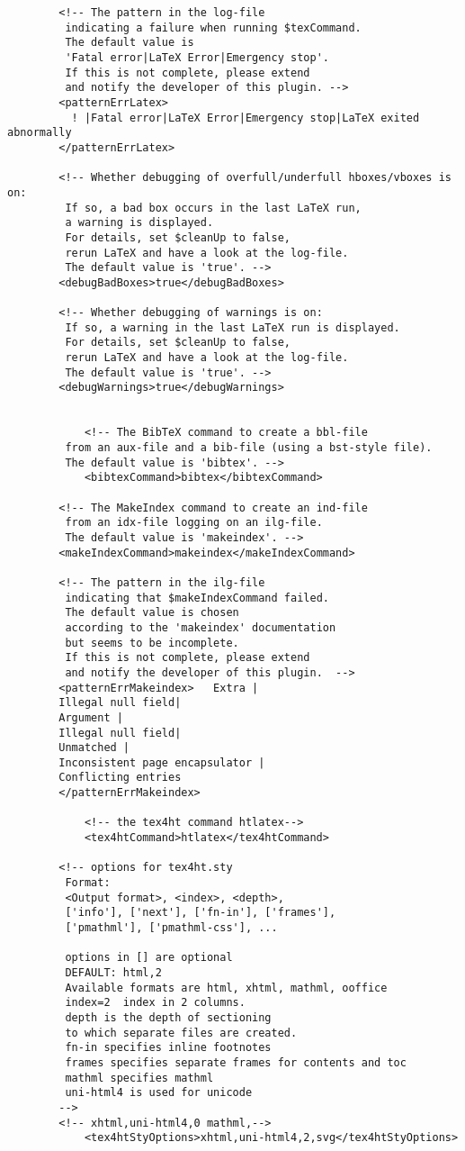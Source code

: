 \documentclass[12pt]{article}
\begin{document}
\begin{lstlisting}
	    <!-- The pattern in the log-file 
		 indicating a failure when running $texCommand. 
		 The default value is 
		 'Fatal error|LaTeX Error|Emergency stop'. 
		 If this is not complete, please extend 
		 and notify the developer of this plugin. -->
	    <patternErrLatex>
	      ! |Fatal error|LaTeX Error|Emergency stop|LaTeX exited abnormally
	    </patternErrLatex>

	    <!-- Whether debugging of overfull/underfull hboxes/vboxes is on: 
		 If so, a bad box occurs in the last LaTeX run, 
		 a warning is displayed. 
		 For details, set $cleanUp to false, 
		 rerun LaTeX and have a look at the log-file.
		 The default value is 'true'. -->
	    <debugBadBoxes>true</debugBadBoxes>

	    <!-- Whether debugging of warnings is on: 
		 If so, a warning in the last LaTeX run is displayed. 
		 For details, set $cleanUp to false, 
		 rerun LaTeX and have a look at the log-file. 
		 The default value is 'true'. -->
	    <debugWarnings>true</debugWarnings>


            <!-- The BibTeX command to create a bbl-file 
		 from an aux-file and a bib-file (using a bst-style file). 
		 The default value is 'bibtex'. -->
            <bibtexCommand>bibtex</bibtexCommand>

	    <!-- The MakeIndex command to create an ind-file 
		 from an idx-file logging on an ilg-file. 
		 The default value is 'makeindex'. -->
	    <makeIndexCommand>makeindex</makeIndexCommand>

	    <!-- The pattern in the ilg-file 
		 indicating that $makeIndexCommand failed. 
		 The default value is chosen 
		 according to the 'makeindex' documentation 
		 but seems to be incomplete.
		 If this is not complete, please extend 
		 and notify the developer of this plugin.  -->
	    <patternErrMakeindex>	Extra |
	    Illegal null field|
	    Argument |
	    Illegal null field|
	    Unmatched |
	    Inconsistent page encapsulator |
	    Conflicting entries
	    </patternErrMakeindex>
 
            <!-- the tex4ht command htlatex-->
            <tex4htCommand>htlatex</tex4htCommand>

	    <!-- options for tex4ht.sty
		 Format: 
		 <Output format>, <index>, <depth>, 
		 ['info'], ['next'], ['fn-in'], ['frames'], 
		 ['pmathml'], ['pmathml-css'], ...
		 
		 options in [] are optional 
		 DEFAULT: html,2 
		 Available formats are html, xhtml, mathml, ooffice 
		 index=2  index in 2 columns. 
		 depth is the depth of sectioning 
		 to which separate files are created. 
		 fn-in specifies inline footnotes 
		 frames specifies separate frames for contents and toc 
		 mathml specifies mathml 
		 uni-html4 is used for unicode
	    -->
	    <!-- xhtml,uni-html4,0 mathml,-->
            <tex4htStyOptions>xhtml,uni-html4,2,svg</tex4htStyOptions>


\end{lstlisting}
\end{document}

